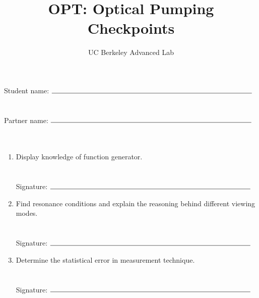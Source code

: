 \documentclass[11pt]{article}
\title{OPT: Optical Pumping Checkpoints}
\author{UC Berkeley Advanced Lab}
\date{}
\begin{document}
\maketitle
Student name: $\rule{10cm}{0.15mm}$\\\\\\
Partner name: $\rule{10cm}{0.15mm}$\\\\\\

\begin{enumerate}
\item
Display knowledge of function generator.\\\\\\
Signature: $\rule{10cm}{0.15mm}$\\
\item
Find resonance conditions and explain the reasoning behind different viewing modes.\\\\\\
Signature: $\rule{10cm}{0.15mm}$\\
\item
Determine the statistical error in measurement technique.\\\\\\
Signature: $\rule{10cm}{0.15mm}$\\
\end{enumerate}
\end{document}
